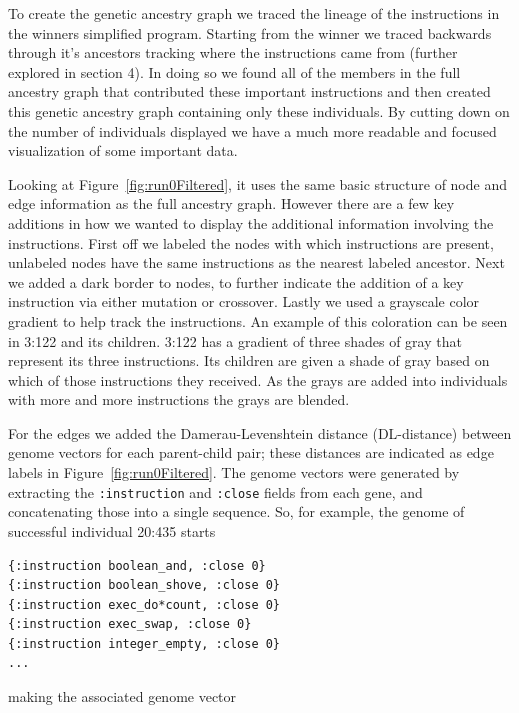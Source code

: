 To create the genetic ancestry graph we traced the lineage of the instructions in the winners
simplified program. Starting from the winner we traced backwards through it's ancestors tracking where
the instructions came from (further explored in section 4). In doing so we found all of the members
in the full ancestry graph that contributed these important instructions and then created this genetic
ancestry graph containing only these individuals. By cutting down on the number of individuals displayed
we have a much more readable and focused visualization of some important data.

Looking at Figure~\ref{fig:run0Filtered}, it uses the same basic structure of node and edge information
as the full ancestry graph.
However there are a few key additions in how we wanted to display the additional information involving
the instructions. First off we labeled the nodes with which instructions are present, unlabeled nodes
have the same instructions as the nearest labeled ancestor. Next we added a dark border to 
nodes, to further indicate the addition of a key instruction via either mutation or crossover. Lastly
we used a grayscale color gradient to help track the instructions. An example of this coloration can be seen
in 3:122 and its children. 3:122 has a gradient of three shades of gray that represent its three instructions.
Its children are given a shade of gray based on which of those instructions they received. As the grays
are added into individuals with more and more instructions the grays are blended.

For the edges we added the Damerau-Levenshtein distance (DL-distance)
between genome vectors for each parent-child pair; these distances
are indicated as edge labels in Figure~\ref{fig:run0Filtered}. The genome
vectors were generated by extracting the \texttt{:instruction} and 
\texttt{:close} fields from each gene, and concatenating those into a
single sequence. So, for example, the genome of successful individual
20:435 starts

\begin{verbatim}
{:instruction boolean_and, :close 0} 
{:instruction boolean_shove, :close 0} 
{:instruction exec_do*count, :close 0} 
{:instruction exec_swap, :close 0} 
{:instruction integer_empty, :close 0}
...
\end{verbatim}

making the associated genome vector


